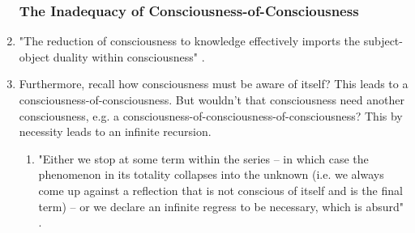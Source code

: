 \begin{enumerate}
  \subsubsection{The Inadequacy of Consciousness-of-Consciousness}
  \item "The reduction of consciousness to knowledge effectively imports the subject-object duality within consciousness" \autocite[10]{sartre}.
  \item Furthermore, recall how consciousness must be aware of itself? This leads to a consciousness-of-consciousness. But wouldn't that consciousness need another consciousness, e.g. a consciousness-of-consciousness-of-consciousness? This by necessity leads to an infinite recursion.
  \begin{enumerate}
    \item "Either we stop at some term within the series -- in which case the phenomenon in its totality collapses into the unknown (i.e. we always come up against a reflection that is not conscious of itself and is the final term) -- or we declare an infinite regress to be necessary, which is absurd" \autocite[11]{sartre}.
  \end{enumerate}


\end{enumerate}
